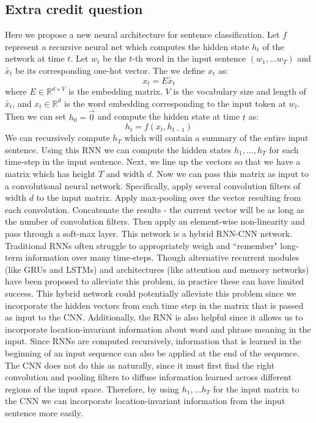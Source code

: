 \documentclass[a4paper]{article}
\begin{document}
\subsection{Extra credit question}
Here we propose a new neural architecture for sentence classification. Let $f$ represent a recursive neural net which computes the hidden state $h_t$ of the network at time $t$. Let $w_t$ be the $t$-th word in the input sentence $(w_1,...w_T)$ and $\tilde{x_t}$ be its corresponding one-hot vector. The we define $x_t$ as:
$$x_t = E \tilde{x_t} $$
where $E \in \mathbb{R}^{d \times V}$ is the embedding matrix. $V$ is the vocabulary size and length of $\tilde{x_t}$, and $x_t \in \mathbb{R}^d$ is the word embedding corresponding to the input token at $w_t$. 
\newline
\newline
Then we can set $h_0 = \vec{0}$ and compute the hidden state at time $t$ as:
$$h_t = f(x_t, h_{t-1}) $$ 
We can recursively compute $h_T$ which will contain a summary of the entire input sentence.
\newline
\newline
Using this RNN we can compute the hidden states $h_1,...,h_{T}$ for each time-step in the input sentence. Next, we line up the vectors so that we have a matrix which has height $T$ and width $d$. 
\newline
\newline
Now we can pass this matrix as input to a convolutional neural network. Specifically, apply several convolution filters of width $d$ to the input matrix. Apply max-pooling over the vector resulting from each convolution. Concatenate the results - the current vector will be as long as the number of convolution filters. Then apply an element-wise non-linearity and pass through a soft-max layer. 
\newline
\newline
This network is a hybrid RNN-CNN network. Traditional RNNs often struggle to appropriately weigh and ``remember" long-term information over many time-steps. Though alternative recurrent modules (like GRUs and LSTMs) and architectures (like attention and memory networks) have been proposed to alleviate this problem, in practice these can have limited success. This hybrid network could potentially alleviate this problem since we incorporate the hidden vectors from each time step in the matrix that is passed as input to the CNN. 
\newline
\newline
Additionally, the RNN is also helpful since it allows us to incorporate location-invariant information about word and phrase meaning in the input. Since RNNs are computed recursively, information that is learned in the beginning of an input sequence can also be applied at the end of the sequence. The CNN does not do this as naturally, since it must first find the right convolution and pooling filters to diffuse information learned across different regions of the input space. Therefore, by using $h_1,...h_T$ for the input matrix to the CNN we can incorporate location-invariant information from the input sentence more easily.
\end{document}
